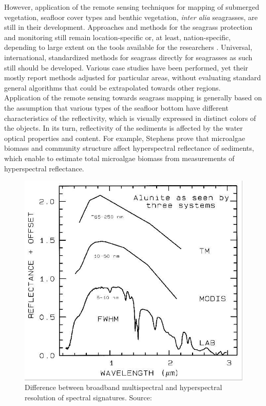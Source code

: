 \documentclass[10pt, a4paper]{article}
\begin{document}
However, application of the remote sensing techniques for mapping of submerged vegetation,
seafloor cover types and benthic vegetation, \textit{inter alia} seagrasses, are still in their development.
Approaches and methods for the seagrass protection and monitoring still remain location-specific or, at
least, nation-specific, depending to large extent on the tools available for the researchers \cite{Mellors09a}\label{Mellors09a}.
Universal, international, standardized methods for seagrass directly for seagrasses
as such still should be developed. Various case studies have been performed, yet their mostly report
methods adjusted for particular areas, without evaluating standard general algorithms that could be
extrapolated towards other regions. \\ Application of the remote sensing towards seagrass mapping is
generally based on the assumption that various types of the seafloor bottom have different
characteristics of the reflectivity, which is visually expressed in distinct colors of the objects. In its
turn, reflectivity of the sediments is affected by the water optical properties and content. For
example, Stephens \cite{Stephens03}\label{Stephens03} prove that microalgae biomass and community structure affect
hyperspectral reflectance of sediments, which enable to estimate total microalgae biomass from
measurements of hyperspectral reflectance. 

\begin{figure}
	\centering
	\includegraphics[scale=0.25]{Fig-12.jpg}
	\caption{Difference between broadband multispectral and hyperspectral resolution of
		spectral signatures. Source: \cite{Clark99}\label{Clark99}}
	\label{fig:2.3}
\end{figure}
\end{document}
